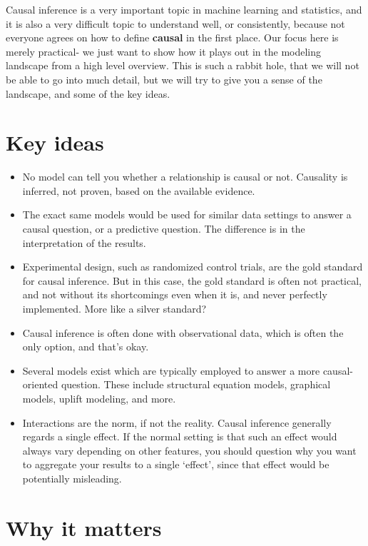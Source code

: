 \documentclass[
  letterpaper,
]{krantz}
\providecommand{\tightlist}{%
  \setlength{\itemsep}{0pt}\setlength{\parskip}{0pt}}\usepackage{longtable,booktabs,array}
\begin{document}
Causal inference is a very important topic in machine learning and
statistics, and it is also a very difficult topic to understand well, or
consistently, because not everyone agrees on how to define
\textbf{causal} in the first place. Our focus here is merely practical-
we just want to show how it plays out in the modeling landscape from a
high level overview. This is such a rabbit hole, that we will not be
able to go into much detail, but we will try to give you a sense of the
landscape, and some of the key ideas.

\section{Key ideas}\label{key-ideas-5}

\begin{itemize}
\tightlist
\item
  No model can tell you whether a relationship is causal or not.
  Causality is inferred, not proven, based on the available evidence.
\item
  The exact same models would be used for similar data settings to
  answer a causal question, or a predictive question. The difference is
  in the interpretation of the results.
\item
  Experimental design, such as randomized control trials, are the gold
  standard for causal inference. But in this case, the gold standard is
  often not practical, and not without its shortcomings even when it is,
  and never perfectly implemented. More like a silver standard?
\item
  Causal inference is often done with observational data, which is often
  the only option, and that's okay.
\item
  Several models exist which are typically employed to answer a more
  causal-oriented question. These include structural equation models,
  graphical models, uplift modeling, and more.
\item
  Interactions are the norm, if not the reality. Causal inference
  generally regards a single effect. If the normal setting is that such
  an effect would always vary depending on other features, you should
  question why you want to aggregate your results to a single `effect',
  since that effect would be potentially misleading.
\end{itemize}

\section{Why it matters}\label{why-it-matters}
\end{document}
